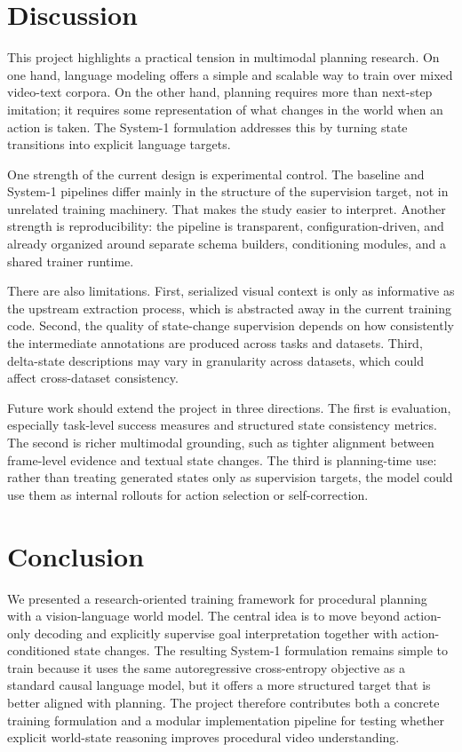 \documentclass[11pt]{article}
\begin{document}
\section{Discussion}
This project highlights a practical tension in multimodal planning research. On one hand, language modeling offers a simple and scalable way to train over mixed video-text corpora. On the other hand, planning requires more than next-step imitation; it requires some representation of what changes in the world when an action is taken. The System-1 formulation addresses this by turning state transitions into explicit language targets.

One strength of the current design is experimental control. The baseline and System-1 pipelines differ mainly in the structure of the supervision target, not in unrelated training machinery. That makes the study easier to interpret. Another strength is reproducibility: the pipeline is transparent, configuration-driven, and already organized around separate schema builders, conditioning modules, and a shared trainer runtime.

There are also limitations. First, serialized visual context is only as informative as the upstream extraction process, which is abstracted away in the current training code. Second, the quality of state-change supervision depends on how consistently the intermediate annotations are produced across tasks and datasets. Third, delta-state descriptions may vary in granularity across datasets, which could affect cross-dataset consistency.

Future work should extend the project in three directions. The first is evaluation, especially task-level success measures and structured state consistency metrics. The second is richer multimodal grounding, such as tighter alignment between frame-level evidence and textual state changes. The third is planning-time use: rather than treating generated states only as supervision targets, the model could use them as internal rollouts for action selection or self-correction.

\section{Conclusion}
We presented a research-oriented training framework for procedural planning with a vision-language world model. The central idea is to move beyond action-only decoding and explicitly supervise goal interpretation together with action-conditioned state changes. The resulting System-1 formulation remains simple to train because it uses the same autoregressive cross-entropy objective as a standard causal language model, but it offers a more structured target that is better aligned with planning. The project therefore contributes both a concrete training formulation and a modular implementation pipeline for testing whether explicit world-state reasoning improves procedural video understanding.
\end{document}
